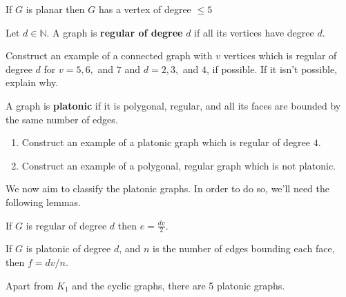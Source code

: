 \begin{theorem} If $G$ is planar then $G$ has a vertex of degree $\leq 5$
\end{theorem}

\begin{definition} Let $d\in \mathbb{N}$.  A graph is \textbf{regular of degree} $d$ if all its vertices have degree $d$.
\end{definition}

\begin{examples} Construct an example of a connected graph with $v$ vertices which is regular of degree $d$ for $v = 5, 6,$ and $7$ and $d=2, 3,$ and $4$, if possible.  If it isn't possible, explain why.
\end{examples}

\begin{definition} A graph is \textbf{platonic} if it is polygonal, regular, and all its faces are bounded by the same number of edges.
\end{definition}

\begin{examples}\leavevmode
\begin{enumerate}
    \item Construct an example of a platonic graph which is regular of degree $4$.
    \item Construct an example of a polygonal, regular graph which is not platonic.
\end{enumerate}
\end{examples}

\noindent We now aim to classify the platonic graphs.  In order to do so, we'll need the following lemmas.

\begin{lemma} If $G$ is regular of degree $d$ then $e=\frac{dv}{2}$.
\end{lemma}

\begin{lemma} If $G$ is platonic of degree $d$, and $n$ is the number of edges bounding each face, then $f = dv/n$.
\end{lemma}

\begin{theorem}[Euclid] Apart from $K_1$ and the cyclic graphs, there are 5 platonic graphs.
\end{theorem}

